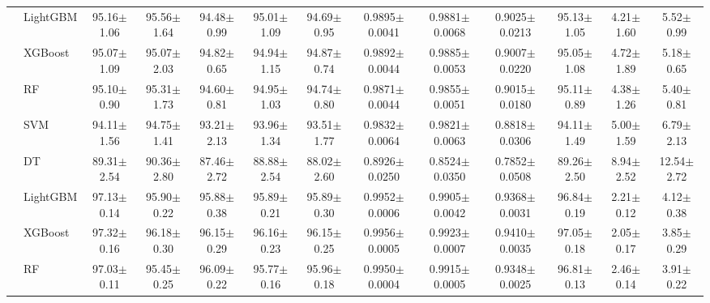\begin{tabular}{@{}llccccccccccc@{}}
\midrule
{} & LightGBM & 95.16{\tiny$\pm$1.06} & 95.56{\tiny$\pm$1.64} & 94.48{\tiny$\pm$0.99} & 95.01{\tiny$\pm$1.09} & 94.69{\tiny$\pm$0.95} & 0.9895{\tiny$\pm$0.0041} & 0.9881{\tiny$\pm$0.0068} & 0.9025{\tiny$\pm$0.0213} & 95.13{\tiny$\pm$1.05} & 4.21{\tiny$\pm$1.60} & 5.52{\tiny$\pm$0.99}\\
 & XGBoost & 95.07{\tiny$\pm$1.09} & 95.07{\tiny$\pm$2.03} & 94.82{\tiny$\pm$0.65} & 94.94{\tiny$\pm$1.15} & 94.87{\tiny$\pm$0.74} & 0.9892{\tiny$\pm$0.0044} & 0.9885{\tiny$\pm$0.0053} & 0.9007{\tiny$\pm$0.0220} & 95.05{\tiny$\pm$1.08} & 4.72{\tiny$\pm$1.89} & 5.18{\tiny$\pm$0.65}\\
 & RF & 95.10{\tiny$\pm$0.90} & 95.31{\tiny$\pm$1.73} & 94.60{\tiny$\pm$0.81} & 94.95{\tiny$\pm$1.03} & 94.74{\tiny$\pm$0.80} & 0.9871{\tiny$\pm$0.0044} & 0.9855{\tiny$\pm$0.0051} & 0.9015{\tiny$\pm$0.0180} & 95.11{\tiny$\pm$0.89} & 4.38{\tiny$\pm$1.26} & 5.40{\tiny$\pm$0.81}\\
 & SVM & 94.11{\tiny$\pm$1.56} & 94.75{\tiny$\pm$1.41} & 93.21{\tiny$\pm$2.13} & 93.96{\tiny$\pm$1.34} & 93.51{\tiny$\pm$1.77} & 0.9832{\tiny$\pm$0.0064} & 0.9821{\tiny$\pm$0.0063} & 0.8818{\tiny$\pm$0.0306} & 94.11{\tiny$\pm$1.49} & 5.00{\tiny$\pm$1.59} & 6.79{\tiny$\pm$2.13}\\
 & DT & 89.31{\tiny$\pm$2.54} & 90.36{\tiny$\pm$2.80} & 87.46{\tiny$\pm$2.72} & 88.88{\tiny$\pm$2.54} & 88.02{\tiny$\pm$2.60} & 0.8926{\tiny$\pm$0.0250} & 0.8524{\tiny$\pm$0.0350} & 0.7852{\tiny$\pm$0.0508} & 89.26{\tiny$\pm$2.50} & 8.94{\tiny$\pm$2.52} & 12.54{\tiny$\pm$2.72}\\
\midrule
{} & LightGBM & 97.13{\tiny$\pm$0.14} & 95.90{\tiny$\pm$0.22} & 95.88{\tiny$\pm$0.38} & 95.89{\tiny$\pm$0.21} & 95.89{\tiny$\pm$0.30} & 0.9952{\tiny$\pm$0.0006} & 0.9905{\tiny$\pm$0.0042} & 0.9368{\tiny$\pm$0.0031} & 96.84{\tiny$\pm$0.19} & 2.21{\tiny$\pm$0.12} & 4.12{\tiny$\pm$0.38}\\
 & XGBoost & 97.32{\tiny$\pm$0.16} & 96.18{\tiny$\pm$0.30} & 96.15{\tiny$\pm$0.29} & 96.16{\tiny$\pm$0.23} & 96.15{\tiny$\pm$0.25} & 0.9956{\tiny$\pm$0.0005} & 0.9923{\tiny$\pm$0.0007} & 0.9410{\tiny$\pm$0.0035} & 97.05{\tiny$\pm$0.18} & 2.05{\tiny$\pm$0.17} & 3.85{\tiny$\pm$0.29}\\
 & RF & 97.03{\tiny$\pm$0.11} & 95.45{\tiny$\pm$0.25} & 96.09{\tiny$\pm$0.22} & 95.77{\tiny$\pm$0.16} & 95.96{\tiny$\pm$0.18} & 0.9950{\tiny$\pm$0.0004} & 0.9915{\tiny$\pm$0.0005} & 0.9348{\tiny$\pm$0.0025} & 96.81{\tiny$\pm$0.13} & 2.46{\tiny$\pm$0.14} & 3.91{\tiny$\pm$0.22}\\

\end{tabular}

